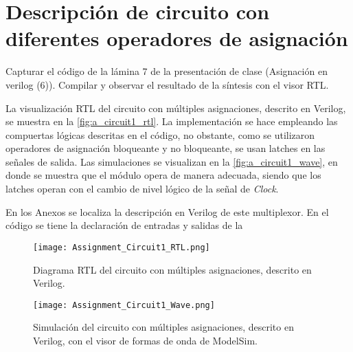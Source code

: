\section{Descripción de circuito con diferentes operadores de asignación \label{sec:s1}}

\begin{center}
	\begin{minipage}{12cm}
		\begin{tcolorbox}[title=Actividad 1]
			Capturar el código de la lámina 7 de la presentación de clase (Asignación en verilog (6)). Compilar y observar el resultado de la síntesis con el visor RTL.
		\end{tcolorbox}	
	\end{minipage}
\end{center}

La visualización RTL del circuito con múltiples asignaciones, descrito en Verilog, se muestra en la \autoref{fig:a_circuit1_rtl}. La implementación se hace empleando las compuertas lógicas descritas en el código, no obstante, como se utilizaron operadores de asignación bloqueante y no bloqueante, se usan latches en las señales de salida. Las simulaciones se visualizan en la \autoref{fig:a_circuit1_wave}, en donde se muestra que el módulo opera de manera adecuada, siendo que los latches operan con el cambio de nivel lógico de la señal de \textit{Clock}.

En los Anexos se localiza la descripción en Verilog de este multiplexor. En el código se tiene la declaración de entradas y salidas de la

\begin{figure}[ht]
	\centering
{\tiny {\tiny }}	\texttt{[image: Assignment\_Circuit1\_RTL.png]}
	\caption{Diagrama RTL del circuito con múltiples asignaciones, descrito en Verilog. \label{fig:a_circuit1_rtl}}
\end{figure}

\begin{figure}[ht]
	\centering
	\texttt{[image: Assignment\_Circuit1\_Wave.png]}
	\caption{Simulación del circuito con múltiples asignaciones, descrito en Verilog, con el visor de formas de onda de ModelSim. \label{fig:a_circuit1__wave}}
\end{figure}